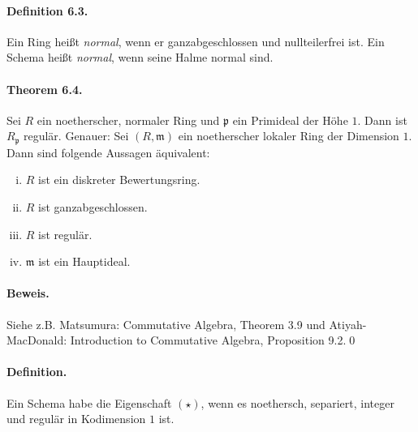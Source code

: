 \paragraph{Definition 6.3.}\label{6.3}
Ein Ring heißt \textit{normal}, wenn er ganzabgeschlossen und nullteilerfrei ist.
Ein Schema heißt \textit{normal}, wenn seine Halme normal sind.

\paragraph{Theorem 6.4.}\label{6.4} Sei $R$ ein noetherscher, normaler Ring und $\mathfrak{p}$ ein Primideal der Hö\-he $1$. Dann ist $R_\mathfrak{p}$ regulär. Genauer: Sei $(R,\mathfrak{m})$ ein noetherscher lokaler Ring der Dimension $1$. Dann sind folgende Aussagen äquivalent:
\begin{enumerate}[(i)]
\item $R$ ist ein diskreter Bewertungsring.
\item $R$ ist ganzabgeschlossen.
\item $R$ ist regulär.
\item $\mathfrak{m}$ ist ein Hauptideal.
\end{enumerate}

\paragraph{Beweis.} Siehe z.B. Matsumura: \glqq Commutative Algebra\grqq, Theorem 3.9 und Ati\-yah-Mac\-Do\-nald: \glqq Introduction to Commutative Algebra\grqq, Proposition 9.2.\qed

\paragraph{Definition.} Ein Schema habe die Eigenschaft $(\star)$, wenn es noethersch, separiert, integer und regulär in Kodimension $1$ ist.

